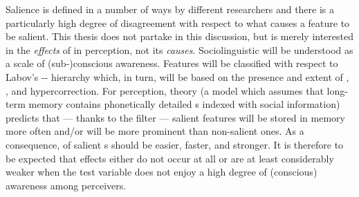 Salience is defined in a number of ways by different researchers and there is a particularly high degree of disagreement with respect to what causes a feature to be salient.
This thesis does not partake in this discussion, but is merely interested in the \emph{effects} of  in perception, not its \emph{causes}.
Sociolinguistic  will be understood as a scale of (sub-)conscious awareness.
Features will be classified with respect to Labov's -- hierarchy which, in turn, will be based on the presence and extent of , , and hypercorrection.
For perception,  theory (a model which assumes that long-term memory contains phonetically detailed s indexed with social information) predicts that --- thanks to the  filter --- salient features will be stored in memory more often and/or will be more prominent than non-salient ones.
As a consequence,  of salient s should be easier, faster, and stronger.
It is therefore to be expected that   effects either do not occur at all or are at least considerably weaker when the test variable does not enjoy a high degree of (conscious) awareness among perceivers.